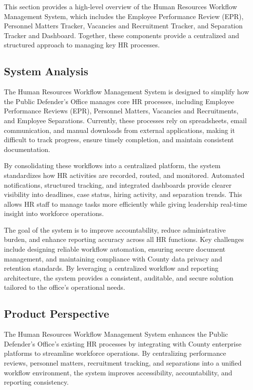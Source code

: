 \documentclass[12pt]{article}
\begin{document}
This section provides a high-level overview of the Human Resources Workflow Management System, which includes the Employee Performance Review (EPR), Personnel Matters Tracker, Vacancies and Recruitment Tracker, and Separation Tracker and Dashboard. Together, these components provide a centralized and structured approach to managing key HR processes.

\subsection{System Analysis}

The Human Resources Workflow Management System is designed to simplify how the Public Defender’s Office manages core HR processes, including Employee Performance Reviews (EPR), Personnel Matters, Vacancies and Recruitments, and Employee Separations. Currently, these processes rely on spreadsheets, email communication, and manual downloads from external applications, making it difficult to track progress, ensure timely completion, and maintain consistent documentation.

By consolidating these workflows into a centralized platform, the system standardizes how HR activities are recorded, routed, and monitored. Automated notifications, structured tracking, and integrated dashboards provide clearer visibility into deadlines, case status, hiring activity, and separation trends. This allows HR staff to manage tasks more efficiently while giving leadership real-time insight into workforce operations.

The goal of the system is to improve accountability, reduce administrative burden, and enhance reporting accuracy across all HR functions. Key challenges include designing reliable workflow automation, ensuring secure document management, and maintaining compliance with County data privacy and retention standards. By leveraging a centralized workflow and reporting architecture, the system provides a consistent, auditable, and secure solution tailored to the office’s operational needs.

\subsection{Product Perspective}

The Human Resources Workflow Management System enhances the Public Defender’s Office’s existing HR processes by integrating with County enterprise platforms to streamline workforce operations. By centralizing performance reviews, personnel matters, recruitment tracking, and separations into a unified workflow environment, the system improves accessibility, accountability, and reporting consistency.
\end{document}
